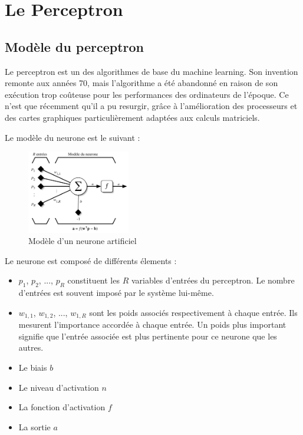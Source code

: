 \section{Le Perceptron}
\fancyhead[R]{\textit{\nouppercase{\leftmark}}}

\subsection{Modèle du perceptron}

Le perceptron est un des algorithmes de base du machine learning. Son invention remonte aux années 70, mais l'algorithme a été abandonné en raison de son exécution trop coûteuse pour les performances des ordinateurs de l’époque. Ce n’est que récemment qu’il a pu resurgir, grâce à l’amélioration des processeurs et des cartes graphiques particulièrement adaptées aux calculs matriciels.

Le modèle du neurone est le suivant : 

\begin{figure}[h]
 \centering
 \includegraphics[width=0.4\textwidth]{img/neurone.png}
 \caption{Modèle d'un neurone artificiel}
\end{figure}

Le neurone est composé de différents élements : 
\begin{itemize}
 \item $p_1$, $p_2$, ..., $p_R$ constituent les $R$ variables d'entrées du perceptron. Le nombre d'entrées est souvent imposé par le système lui-même.
 \item $w_{1,1}$, $w_{1,2}$, ..., $w_{1,R}$ sont les poids associés respectivement à chaque entrée. Ils mesurent l'importance accordée à chaque entrée. Un poids
 plus important signifie que l'entrée associée est plus pertinente pour ce neurone que les autres.
 \item Le biais $b$
 \item Le niveau d'activation $n$
 \item La fonction d'activation $f$
 \item La sortie $a$
\end{itemize}

